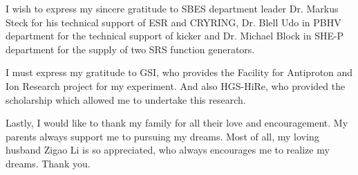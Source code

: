 I wish to express my sincere gratitude to \gls{SBES} department leader Dr. Markus Steck for his technical support of ESR and CRYRING, Dr. Blell Udo in \gls{PBHV} department for the technical support of kicker and Dr. Michael Block in \gls{SHE-P} department for the supply of two SRS function generators. 

I must express my gratitude to GSI, who provides the Facility for Antiproton and Ion Research project for my experiment. And also HGS-HiRe, who provided the scholarship which allowed me to undertake this research.


Lastly, I would like to thank my family for all their love and encouragement. My parents always support me to pursuing my dreams. Most of all, my loving husband Zigao Li is so appreciated, who always encourages me to realize my dreams. Thank you.




